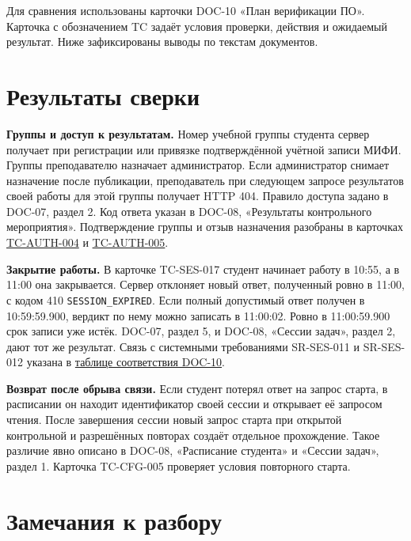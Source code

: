 \documentclass[12pt,a4paper]{article}
\begin{document}
Для сравнения использованы карточки DOC-10 «План верификации ПО». Карточка с обозначением TC задаёт условия проверки, действия и ожидаемый результат. Ниже зафиксированы выводы по текстам документов.

\section{Результаты сверки}\label{ux440ux435ux437ux443ux43bux44cux442ux430ux442ux44b-ux441ux432ux435ux440ux43aux438}

\hypertarget{результаты-сверки}{}

\textbf{Группы и доступ к результатам.} Номер учебной группы студента сервер получает при регистрации или привязке подтверждённой учётной записи МИФИ. Группы преподавателю назначает администратор. Если администратор снимает назначение после публикации, преподаватель при следующем запросе результатов своей работы для этой группы получает HTTP 404. Правило доступа задано в DOC-07, раздел 2. Код ответа указан в DOC-08, «Результаты контрольного мероприятия». Подтверждение группы и отзыв назначения разобраны в карточках {\href{../10\_Верификация\_и\_тестирование/DOC-10\_План\_верификации.pdf\#tc-auth-004}{TC-AUTH-004}} и {\href{../10\_Верификация\_и\_тестирование/DOC-10\_План\_верификации.pdf\#tc-auth-005}{TC-AUTH-005}}.

\textbf{Закрытие работы.} В карточке TC-SES-017 студент начинает работу в 10:55, а в 11:00 она закрывается. Сервер отклоняет новый ответ, полученный ровно в 11:00, с кодом 410 \texttt{SESSION\_\allowbreak{}EXPIRED}. Если полный допустимый ответ получен в 10:59:59.900, вердикт по нему можно записать в 11:00:02. Ровно в 11:00:59.900 срок записи уже истёк. DOC-07, раздел 5, и DOC-08, «Сессии задач», раздел 2, дают тот же результат. Связь с системными требованиями SR-SES-011 и SR-SES-012 указана в {\href{../10\_Верификация\_и\_тестирование/DOC-10\_План\_верификации.pdf\#соответствие-карточек-требованиям}{таблице соответствия DOC-10}}.

\textbf{Возврат после обрыва связи.} Если студент потерял ответ на запрос старта, в расписании он находит идентификатор своей сессии и открывает её запросом чтения. После завершения сессии новый запрос старта при открытой контрольной и разрешённых повторах создаёт отдельное прохождение. Такое различие явно описано в DOC-08, «Расписание студента» и «Сессии задач», раздел 1. Карточка TC-CFG-005 проверяет условия повторного старта.

\section{Замечания к разбору}\label{ux437ux430ux43cux435ux447ux430ux43dux438ux44f-ux43a-ux440ux430ux437ux431ux43eux440ux443}
\end{document}
